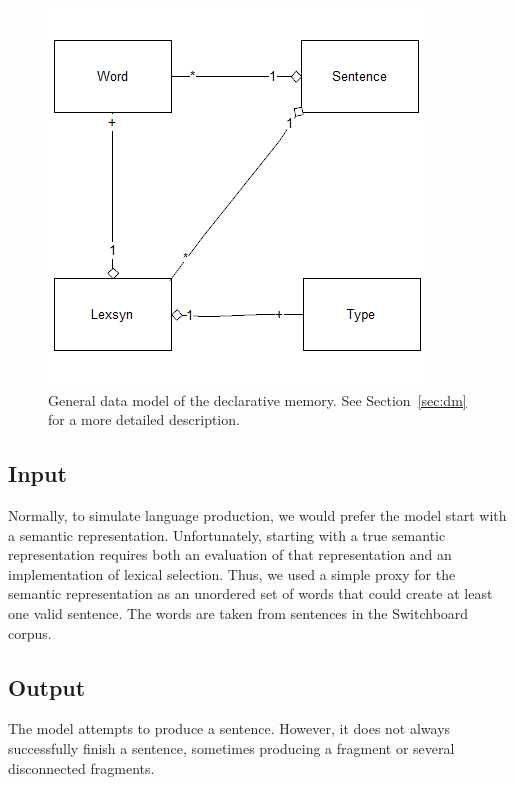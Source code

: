\begin{figure}[ht]
\begin{center}
\includegraphics[width=0.95\columnwidth]{figures/prodtypes}
\end{center}
\caption{General data model of the declarative memory. See Section~\ref{sec:dm} for a more detailed description.}  
\label{fig:dm}
\end{figure}

\subsection{Input}
Normally, to simulate language production, we would prefer the model start with a semantic representation. Unfortunately, starting with a true semantic representation requires both an evaluation of that representation and an implementation of lexical selection. Thus, we used a simple proxy for the semantic representation as an unordered set of words that could create at least one valid sentence. The words are taken from sentences in the Switchboard corpus.

\subsection{Output}
The model attempts to produce a sentence. However, it does not always successfully finish a sentence, sometimes producing a fragment or several disconnected fragments.



